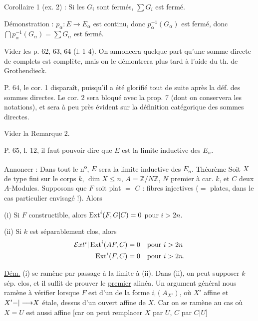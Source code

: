 Corollaire 1 (ex. 2) : Si les $G_i$ sont fermés, $\sum G_i$ est fermé.

Démonstration : $p_\alpha:E\longrightarrow E_\alpha$ est continu, donc $p_\alpha^{-1}(G_\alpha)$ est fermé, donc $\bigcap p_\alpha^{-1}(G_\alpha)=\sum G_\alpha$ est fermé.

Vider les p. 62, 63, 64 (l. 1-4). On annoncera quelque part qu'une somme directe de complets est complète, mais on le démontrera plus tard à l'aide du th. de Grothendieck.

P. 64, le cor. 1 disparaît, puisqu'il a été glorifié tout de suite après la déf. des sommes directes. Le cor. 2 sera bloqué avec la prop. 7 (dont on conservera les notations), et sera à peu près évident sur la définition catégorique des sommes directes.

Vider la Remarque 2.

P. 65, l. 12, il faut pouvoir dire que $E$ est la limite inductive des $E_n$.

Annoncer : Dans tout le n\textsuperscript{o}, $E$ sera la limite inductive des $E_n$.
\uline{Théorème} Soit $X$ de type  fini sur le corps $k$, $\dim X\leq n$, $A=\mathbb{Z}/N\mathbb{Z}$, $N$ premier à car. $k$,   et $C$ deux $A$-Modules. Supposons que $F$ soit plat $=$ $C$ : fibres injectives ($=$ plates, dans le cas particulier envisagé !). Alors

(i) Si $F$ constructible, alors $\operatorname{Ext}^i(F,{G|C})=0$ pour $i>2n$.

(ii) Si $k$ est séparablement clos, alors 
\[
\begin{aligned}
{\mathcal{E}xt^i|\operatorname{Ext}^i}({{A}}{F},C)&=0&\text{pour }i&>2n\\
\operatorname{Ext}^i(F,C)&=0&\text{pour }i&>2n.
\end{aligned}
\]

\uline{Dém.} (i) se ramène par passage à la limite à (ii). Dans (ii), on peut supposer $k$ sép. clos, et  il suffit de prouver le \uline{premier} alinéa.  Un argument général nous ramène à  vérifier  lorsque $F$ est  d'un  de la forme $i_!(A_{X'})$, où $X'$ affine et $X'{-|\longrightarrow}X$ étale,  dessus d'un ouvert affine  de $X$. Car on se ramène au cas où $X=U$ est aussi affine [car on peut remplacer $X$ par $U$, $C$ par $C|U$]

